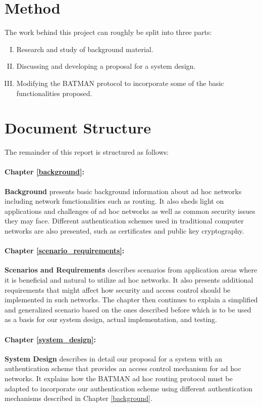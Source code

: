\section{Method}
The work behind this project can roughly be split into three parts:
  
\begin{enumerate}[I.]
\item Research and study of background material.
\item Discussing and developing a proposal for a system design.
\item Modifying the BATMAN protocol to incorporate some of the basic functionalities proposed.
\end{enumerate}

\section{Document Structure}
The remainder of this report is structured as follows:

\paragraph{Chapter \ref{background}:}\textbf{Background} presents basic background information about ad hoc networks including network functionalities such as routing. It also sheds light on applications and challenges of ad hoc networks as well as common security issues they may face. Different authentication schemes used in traditional computer networks are also presented, such as certificates and public key cryptography.

\paragraph{Chapter \ref{scenario_requirements}:}\textbf{Scenarios and Requirements} describes scenarios from application areas where it is beneficial and natural to utilize ad hoc networks. It also presents additional requirements that might affect how security and access control should be implemented in such networks. The chapter then continues to explain a simplified and generalized scenario based on the ones described before which is to be used as a basis for our system design, actual implementation, and testing.

\paragraph{Chapter \ref{system_design}:}\textbf{System Design} describes in detail our proposal for a system with an authentication scheme that provides an access control mechanism for ad hoc networks. It explains how the BATMAN ad hoc routing protocol must be adapted to incorporate our authentication scheme using different authentication mechanisms described in Chapter \ref{background}.

